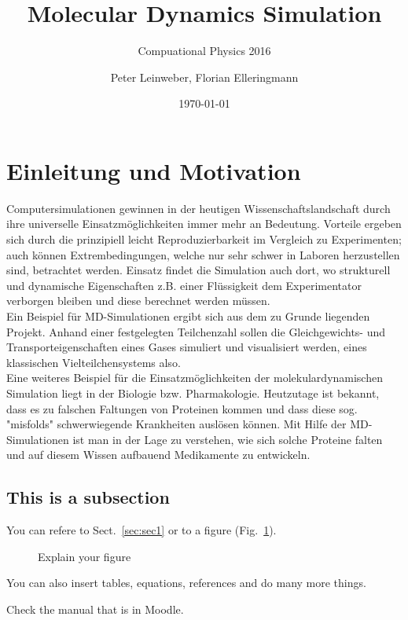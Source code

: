 \documentclass[a4paper]{scrartcl}
\title{Molecular Dynamics Simulation}
\subtitle{Compuational Physics 2016}<++>
\author{Peter Leinweber, Florian Elleringmann}
\date{\today}
\begin{document}
\maketitle


\section{Einleitung und Motivation} \label{sec:einl}

Computersimulationen gewinnen in der heutigen Wissenschaftslandschaft durch ihre universelle Einsatzmöglichkeiten immer mehr an Bedeutung. Vorteile ergeben sich durch die prinzipiell leicht Reproduzierbarkeit im Vergleich zu Experimenten; auch können Extrembedingungen, welche nur sehr schwer in Laboren herzustellen sind, betrachtet werden. Einsatz findet die Simulation auch dort, wo strukturell und dynamische Eigenschaften z.B. einer Flüssigkeit dem Experimentator verborgen bleiben und diese berechnet werden müssen.\\
Ein Beispiel für MD-Simulationen ergibt sich aus dem zu Grunde liegenden Projekt. Anhand einer festgelegten Teilchenzahl sollen die Gleichgewichts- und Transporteigenschaften eines Gases simuliert und visualisiert werden, eines klassischen Vielteilchensystems also.\\
Eine weiteres Beispiel für die Einsatzmöglichkeiten der molekulardynamischen Simulation liegt in der Biologie bzw. Pharmakologie. Heutzutage ist bekannt, dass es zu falschen Faltungen von Proteinen kommen und dass diese sog. "misfolds" schwerwiegende Krankheiten auslösen können. Mit Hilfe der MD-Simulationen ist man in der Lage zu verstehen, wie sich solche Proteine falten und auf diesem Wissen aufbauend Medikamente zu entwickeln.

\subsection{This is a subsection}
\label{sec:subsec}
You can refere to Sect.~\ref{sec:sec1} or to a figure
(Fig.~\ref{fig:plot}).

\begin{figure}
\begin{center}
\caption{Explain your figure}
\label{fig:plot}
\end{center}
\end{figure} 

You can also insert tables, equations, references and do many more
things. 


Check the manual that is in Moodle.
\end{document}
